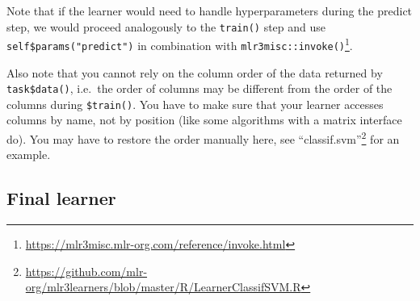 \documentclass[12pt,]{scrbook}
\newenvironment{Shaded}{}{}
\newcommand{\ControlFlowTok}[1]{\textcolor[rgb]{0.00,0.00,1.00}{#1}}
\newcommand{\DataTypeTok}[1]{#1}
\newcommand{\KeywordTok}[1]{\textcolor[rgb]{0.00,0.00,1.00}{#1}}
\newcommand{\NormalTok}[1]{#1}
\newcommand{\OperatorTok}[1]{#1}
\newcommand{\OtherTok}[1]{\textcolor[rgb]{1.00,0.25,0.00}{#1}}
\newcommand{\StringTok}[1]{\textcolor[rgb]{0.00,0.50,0.50}{#1}}
\renewcommand{\href}[2]{#2\footnote{\url{#1}}}
\begin{document}
\begin{Shaded}
\end{Shaded}

Note that if the learner would need to handle hyperparameters during the predict step, we would proceed analogously to the \texttt{train()} step and use \texttt{self\$params("predict")} in combination with \href{https://mlr3misc.mlr-org.com/reference/invoke.html}{\texttt{mlr3misc::invoke()}}.

Also note that you cannot rely on the column order of the data returned by \texttt{task\$data()}, i.e.~the order of columns may be different from the order of the columns during \texttt{\$train()}.
You have to make sure that your learner accesses columns by name, not by position (like some algorithms with a matrix interface do).
You may have to restore the order manually here, see \href{https://github.com/mlr-org/mlr3learners/blob/master/R/LearnerClassifSVM.R}{``classif.svm''} for an example.

\hypertarget{final-learner}{%
\subsection{Final learner}\label{final-learner}}
\end{document}

